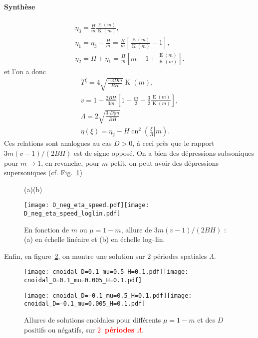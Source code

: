 \documentclass[10pt,a4paper, oneside, fleqn]{myarticle}
\DeclareMathOperator{\ellipE}{E}
\DeclareMathOperator{\ellipK}{K}
\DeclareMathOperator{\cn}{cn}
\begin{document}
\paragraph{Synthèse  }
\begin{gather}
  \eta_3 = \frac{H}{m}\frac{\ellipE(m)}{\ellipK(m)},\\
  \eta_1 = \eta_3 - \frac{H}{m} = \frac{H}{m}\left[\frac{\ellipE(m)}{\ellipK(m)}-1\right],\\
  \eta_2 = H+\eta_1 = \frac{H}{m} \left[m-1+\frac{\ellipE(m)}{\ellipK(m)}\right].
\end{gather}
et l'on a donc
\begin{gather}
  T^\xi =  4 \sqrt{\frac{-3Dm}{BH}}\ellipK(m), \label{expr_Txi2}\\
  v=1-\frac{2BH}{3m}\left[1-\frac{m}{2}-\frac{3}{2}\frac{\ellipE(m)}{\ellipK(m)}\right],\\
  \Lambda = 2\sqrt{\frac{3|D|m}{BH}}\\
  \eta(\xi) = \eta_2- H \cn^2\left(\left.\frac{\xi}{\Lambda}\right\vert m\right).
\end{gather}
Ces relations sont analogues au cas $D>0$, à ceci près que le rapport $3m(v-1)/(2BH)$ est de signe opposé. On a bien des dépressions subsoniques pour $m\to 1$, en revanche, pour $m$ petit, on peut avoir des dépressions supersoniques (cf. Fig.~\ref{fig_eta_speed_D_neg})

\begin{figure}[ht!]
  \centering
  \quad(a)\hspace*{6cm}(b)
  
  \texttt{[image: D\_neg\_eta\_speed.pdf]}\texttt{[image: D\_neg\_eta\_speed\_loglin.pdf]}
  \caption{En fonction de $m$ ou $\mu=1-m$, allure de $3m(v-1)/(2BH)$ : (a) en échelle linéaire et (b) en échelle log--lin.}\label{fig_eta_speed_D_neg}
\end{figure}

Enfin, en figure~\ref{fig_4_cnoidales}, on montre une solution sur $2$ périodes spatiales $\Lambda$. 

\begin{figure}[ht!]
  \centering
  \texttt{[image: cnoidal\_D=0.1\_mu=0.5\_H=0.1.pdf]}\texttt{[image: cnoidal\_D=0.1\_mu=0.005\_H=0.1.pdf]} 

  \texttt{[image: cnoidal\_D=-0.1\_mu=0.5\_H=0.1.pdf]}\texttt{[image: cnoidal\_D=-0.1\_mu=0.005\_H=0.1.pdf]} 
  \caption{Allures de solutions cnoidales pour différents $\mu=1-m$ et des $D$ positifs ou négatifs, sur \textcolor{red}{\textbf{$2$~périodes $\Lambda$}}.\textcolor{red}{\bfseries {}}}\label{fig_4_cnoidales}
\end{figure}
\end{document}
